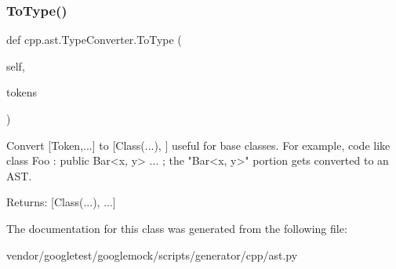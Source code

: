 \subsubsection{\texorpdfstring{To\+Type()}{ToType()}}
{\footnotesize\ttfamily def cpp.\+ast.\+Type\+Converter.\+To\+Type (\begin{DoxyParamCaption}\item[{}]{self,  }\item[{}]{tokens }\end{DoxyParamCaption})}

\begin{DoxyVerb}Convert [Token,...] to [Class(...), ] useful for base classes.
For example, code like class Foo : public Bar<x, y> { ... };
the "Bar<x, y>" portion gets converted to an AST.

Returns:
  [Class(...), ...]
\end{DoxyVerb}
 

The documentation for this class was generated from the following file\+:\begin{DoxyCompactItemize}
\item 
vendor/googletest/googlemock/scripts/generator/cpp/ast.\+py\end{DoxyCompactItemize}
